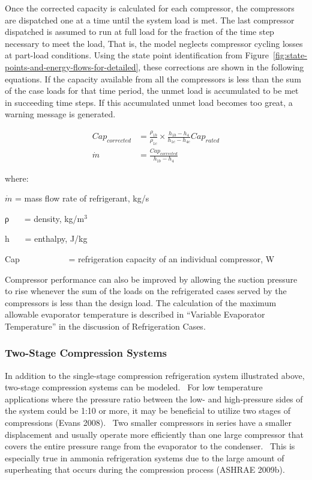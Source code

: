 Once the corrected capacity is calculated for each compressor, the compressors are dispatched one at a time until the system load is met. The last compressor dispatched is assumed to run at full load for the fraction of the time step necessary to meet the load, That is, the model neglects compressor cycling losses at part-load conditions. Using the state point identification from Figure~\ref{fig:state-points-and-energy-flows-for-detailed}, these corrections are shown in the following equations. If the capacity available from all the compressors is less than the sum of the case loads for that time period, the unmet load is accumulated to be met in succeeding time steps. If this accumulated unmet load becomes too great, a warning message is generated.

\begin{equation}
  \begin{array}{rl}
    Cap_{corrected} &= \frac{\rho_{1b}}{\rho_{1c}} \times \frac{h_{1b} - h_4}{h_{1c} - h_{4c}} Cap_{rated} \\
    \dot{m} &= \frac{Cap_{corrected}}{h_{1b} - h_4}
  \end{array}
\end{equation}

where:

\(\dot m\) = mass flow rate of refrigerant, kg/s

ρ~~~ = density, kg/m\(^{3}\)

h~~~ = enthalpy, J/kg

Cap~~~~~~~~~~~ = refrigeration capacity of an individual compressor, W

Compressor performance can also be improved by allowing the suction pressure to rise whenever the sum of the loads on the refrigerated cases served by the compressors is less than the design load. The calculation of the maximum allowable evaporator temperature is described in ``Variable Evaporator Temperature'' in the discussion of Refrigeration Cases.

\subsubsection{Two-Stage Compression Systems}\label{two-stage-compression-systems}

In addition to the single-stage compression refrigeration system illustrated above, two-stage compression systems can be modeled.~ For low temperature applications where the pressure ratio between the low- and high-pressure sides of the system could be 1:10 or more, it may be beneficial to utilize two stages of compressions (Evans 2008).~ Two smaller compressors in series have a smaller displacement and usually operate more efficiently than one large compressor that covers the entire pressure range from the evaporator to the condenser.~ This is especially true in ammonia refrigeration systems due to the large amount of superheating that occurs during the compression process (ASHRAE 2009b).

